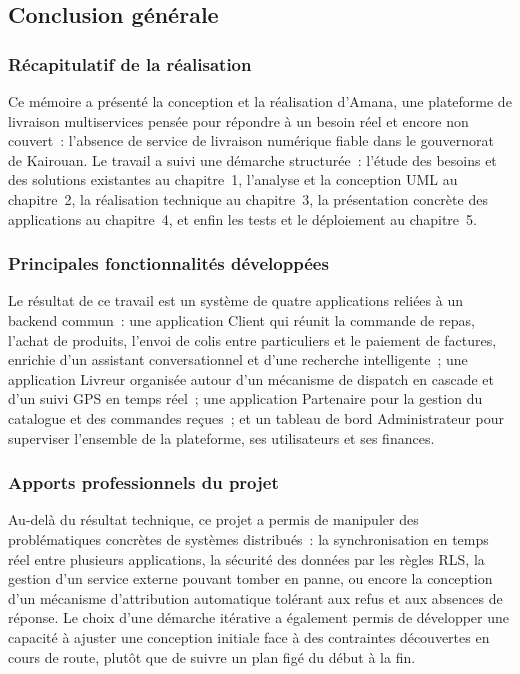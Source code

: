 \documentclass[12pt,fleqn,a4paper]{report}
\begin{document}
\begin{justify}
\chapter*{Conclusion générale}

\subsection*{Récapitulatif de la réalisation}

Ce mémoire a présenté la conception et la réalisation d'Amana, une plateforme de livraison multiservices pensée pour répondre à un besoin réel et encore non couvert~: l'absence de service de livraison numérique fiable dans le gouvernorat de Kairouan. Le travail a suivi une démarche structurée~: l'étude des besoins et des solutions existantes au chapitre~1, l'analyse et la conception UML au chapitre~2, la réalisation technique au chapitre~3, la présentation concrète des applications au chapitre~4, et enfin les tests et le déploiement au chapitre~5.

\subsection*{Principales fonctionnalités développées}

Le résultat de ce travail est un système de quatre applications reliées à un backend commun~: une application Client qui réunit la commande de repas, l'achat de produits, l'envoi de colis entre particuliers et le paiement de factures, enrichie d'un assistant conversationnel et d'une recherche intelligente~; une application Livreur organisée autour d'un mécanisme de dispatch en cascade et d'un suivi GPS en temps réel~; une application Partenaire pour la gestion du catalogue et des commandes reçues~; et un tableau de bord Administrateur pour superviser l'ensemble de la plateforme, ses utilisateurs et ses finances.

\subsection*{Apports professionnels du projet}

Au-delà du résultat technique, ce projet a permis de manipuler des problématiques concrètes de systèmes distribués~: la synchronisation en temps réel entre plusieurs applications, la sécurité des données par les règles RLS, la gestion d'un service externe pouvant tomber en panne, ou encore la conception d'un mécanisme d'attribution automatique tolérant aux refus et aux absences de réponse. Le choix d'une démarche itérative a également permis de développer une capacité à ajuster une conception initiale face à des contraintes découvertes en cours de route, plutôt que de suivre un plan figé du début à la fin.


\end{justify}
\end{document}
